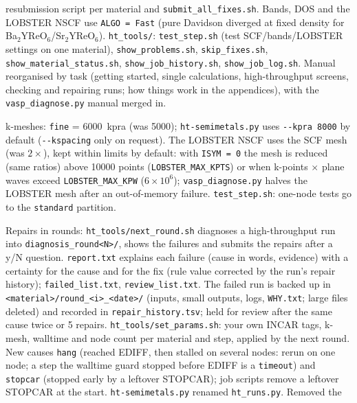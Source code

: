 \documentclass[11pt,a4paper]{scrartcl}
\begin{document}
\begin{description}
    resubmission script per material and \texttt{submit\_all\_fixes.sh}.
    Bands, DOS and the LOBSTER NSCF use \texttt{ALGO = Fast} (pure Davidson diverged at
    fixed density for Ba$_2$YReO$_6$/Sr$_2$YReO$_6$).
    \texttt{ht\_tools/}: \texttt{test\_step.sh} (test SCF/bands/LOBSTER settings on one
    material), \texttt{show\_problems.sh}, \texttt{skip\_fixes.sh},
    \texttt{show\_material\_status.sh}, \texttt{show\_job\_history.sh},
    \texttt{show\_job\_log.sh}.  Manual reorganised by task (getting started, single
    calculations, high-throughput screens, checking and repairing runs; how things work in
    the appendices), with the \texttt{vasp\_diagnose.py} manual merged in.
  \item[\textcolor{mainblue}{v2.5} (2026-10-12)]
    k-meshes: \texttt{fine} = 6000~kpra (was 5000); \texttt{ht-semimetals.py} uses
    \texttt{-{}-kpra 8000} by default (\texttt{-{}-kspacing} only on request).  The LOBSTER
    NSCF uses the SCF mesh (was $2\times$), kept within limits by default: with
    \texttt{ISYM = 0} the mesh is reduced (same ratios) above 10000 points
    (\texttt{LOBSTER\_MAX\_KPTS}) or when k-points $\times$ plane waves exceed
    \texttt{LOBSTER\_MAX\_KPW} ($6\times10^6$); \texttt{vasp\_diagnose.py} halves the
    LOBSTER mesh after an out-of-memory failure.  \texttt{test\_step.sh}: one-node tests
    go to the \texttt{standard} partition.
  \item[\textcolor{mainblue}{v2.6} (2026-10-13)]
    Repairs in rounds: \texttt{ht\_tools/next\_round.sh} diagnoses a high-throughput run into
    \texttt{diagnosis\_round<N>/}, shows the failures and submits the repairs after a y/N
    question.  \texttt{report.txt} explains each failure (cause in words, evidence) with a
    certainty for the cause and for the fix (rule value corrected by the run's repair history);
    \texttt{failed\_list.txt}, \texttt{review\_list.txt}.  The failed run is backed up in
    \texttt{<material>/round\_<i>\_<date>/} (inputs, small outputs, logs, \texttt{WHY.txt};
    large files deleted) and recorded in \texttt{repair\_history.tsv}; held for review after the
    same cause twice or 5 repairs.  \texttt{ht\_tools/set\_params.sh}: your own INCAR tags,
    k-mesh, walltime and node count per material and step, applied by the next round.  New
    causes \texttt{hang} (reached EDIFF, then stalled on several nodes: rerun on one node; a step
    the walltime guard stopped before EDIFF is a \texttt{timeout}) and
    \texttt{stopcar} (stopped early by a leftover STOPCAR); job scripts remove a leftover STOPCAR
    at the start.  \texttt{ht-semimetals.py} renamed \texttt{ht\_runs.py}.  Removed the

\end{description}
\end{document}
